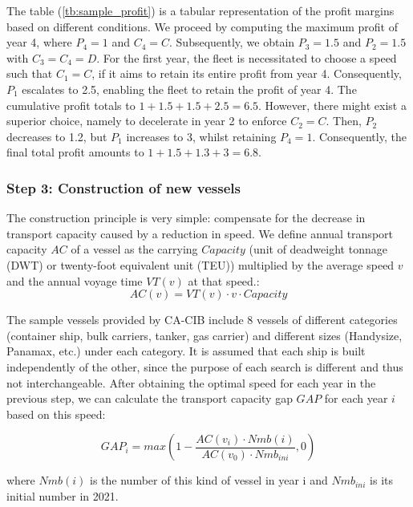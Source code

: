 \documentclass[a4paper,12pt]{article}
\begin{document}
The table (\ref{tb:sample_profit}) is a tabular representation of the profit margins based on different conditions.
We proceed by computing the maximum profit of year 4, where $P_4 = 1$ and $C_4 = C$. Subsequently, we obtain $P_3 = 1.5$ and $P_2 = 1.5$ with $C_3 = C_4 = D$. For the first year, the fleet is necessitated to choose a speed such that $C_1 = C$, if it aims to retain its entire profit from year 4. Consequently, $P_1$ escalates to 2.5, enabling the fleet to retain the profit of year 4. The cumulative profit totals to $1+1.5+1.5+2.5 = 6.5$. However, there might exist a superior choice, namely to decelerate in year 2 to enforce $C_2 = C$. Then, $P_2$ decreases to 1.2, but $P_1$ increases to 3, whilst retaining $P_4 = 1$. Consequently, the final total profit amounts to $1 + 1.5 + 1.3 + 3 = 6.8$.


\subsubsection{Step 3: Construction of new vessels}
The construction principle is very simple: compensate for the decrease in transport capacity caused by a reduction in speed.
We define annual transport capacity $AC$ of a vessel as the carrying $Capacity$ (unit of deadweight tonnage (DWT) or twenty-foot equivalent unit (TEU)) multiplied by the average speed $v$ and the annual voyage time $VT(v)$ at that speed.:
\begin{equation}
	\label{eq:AC}
	AC(v) = VT(v)  \cdot v \cdot Capacity
\end{equation}

The sample vessels provided by CA-CIB include 8 vessels of different categories (container ship, bulk carriers, tanker, gas carrier) and different sizes (Handysize, Panamax, etc.) under each category.
It is assumed that each ship is built independently of the other, since the purpose of each search is different and thus not interchangeable.
After obtaining the optimal speed for each year in the previous step, we can calculate the transport capacity gap $GAP$ for each year $i$ based on this speed:

\begin{equation}
	\label{eq:gap}
	GAP_{i} = max(1 - \frac{AC(v_i) \cdot Nmb(i)}{AC(v_0) \cdot Nmb_{ini}}, 0)
\end{equation}

where $Nmb(i)$ is the number of this kind of vessel in year i and $Nmb_{ini}$ is its initial number in 2021.\\
\end{document}
